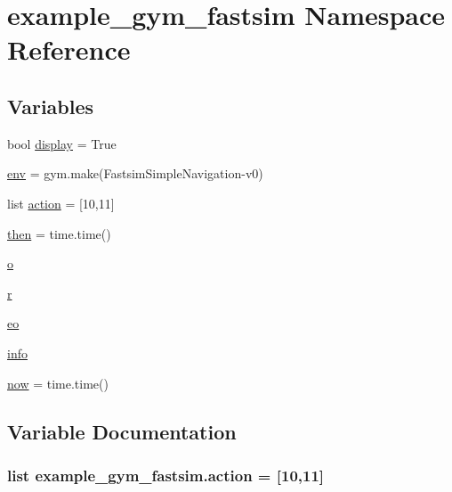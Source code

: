 \hypertarget{namespaceexample__gym__fastsim}{}\section{example\+\_\+gym\+\_\+fastsim Namespace Reference}
\label{namespaceexample__gym__fastsim}
\subsection*{Variables}
\begin{DoxyCompactItemize}
\item 
bool \hyperlink{namespaceexample__gym__fastsim_a15f29b916c31e3bb3f4895a1df2fe32b}{display} = True
\item 
\hyperlink{namespaceexample__gym__fastsim_a5420738ae207eb154b48262b4438429c}{env} = gym.\+make(\textquotesingle{}Fastsim\+Simple\+Navigation-\/v0\textquotesingle{})
\item 
list \hyperlink{namespaceexample__gym__fastsim_a0a5503d72d363777c3d9d909c036fc67}{action} = \mbox{[}10,11\mbox{]}
\item 
\hyperlink{namespaceexample__gym__fastsim_ac8cdd8b21bce71c10c7e5d3036535bc2}{then} = time.\+time()
\item 
\hyperlink{namespaceexample__gym__fastsim_a95b5dcc536bf1d4ec4c79b029df240c4}{o}
\item 
\hyperlink{namespaceexample__gym__fastsim_ab91100dcd37344dc3f1dd167a1018f14}{r}
\item 
\hyperlink{namespaceexample__gym__fastsim_a0e5ca027689f4d4cc7e70df16dd27c4a}{eo}
\item 
\hyperlink{namespaceexample__gym__fastsim_a6bb3791353d444d66f56aa3a8f7af63d}{info}
\item 
\hyperlink{namespaceexample__gym__fastsim_ab91cf8dd14998cfae38d5dd1a7c4d954}{now} = time.\+time()
\end{DoxyCompactItemize}


\subsection{Variable Documentation}
\subsubsection[{\texorpdfstring{action}{action}}]{\setlength{\rightskip}{0pt plus 5cm}list example\+\_\+gym\+\_\+fastsim.\+action = \mbox{[}10,11\mbox{]}}\hypertarget{namespaceexample__gym__fastsim_a0a5503d72d363777c3d9d909c036fc67}{}\label{namespaceexample__gym__fastsim_a0a5503d72d363777c3d9d909c036fc67}
